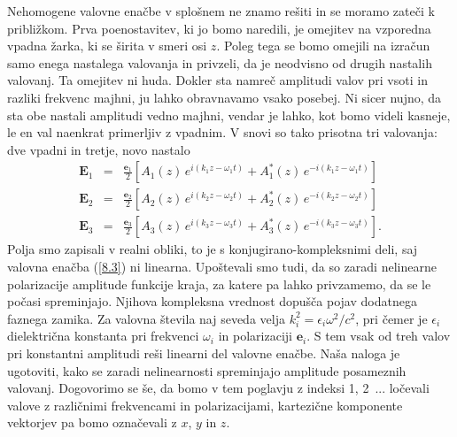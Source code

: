 Nehomogene valovne enačbe v splošnem ne znamo rešiti in se moramo zateči k približkom.
Prva poenostavitev, ki jo bomo naredili, je omejitev na vzporedna vpadna žarka,
ki se širita v smeri osi $z$. Poleg tega se bomo omejili na izračun samo enega
nastalega valovanja in privzeli, da je neodvisno od drugih nastalih valovanj.
Ta omejitev ni huda. Dokler sta namreč amplitudi valov pri vsoti in razliki
frekvenc majhni, ju lahko obravnavamo vsako posebej. Ni sicer nujno,
da sta obe nastali amplitudi vedno majhni, vendar je lahko, kot bomo videli kasneje, 
le en val naenkrat primerljiv z vpadnim. V snovi so tako prisotna tri valovanja:
dve vpadni in tretje, novo nastalo
\begin{eqnarray}
\mathbf{E}_{1} & = & \frac{\mathbf{e}_{1}}{2}\left[A_{1}(z)\, 
e^{i(k_{1}z-\omega_{1}t)}+A_{1}^{*}(z)\, e^{-i(k_{1}z-\omega_{1}t)}\right]\nonumber \\
\mathbf{E}_{2} & = & \frac{\mathbf{e}_{2}}{2}\left[A_{2}(z)\, 
e^{i(k_{2}z-\omega_{2}t)}+A_{2}^{*}(z)\, e^{-i(k_{2}z-\omega_{2}t)}\right]\nonumber \\
\mathbf{E}_{3} & = & \frac{\mathbf{e}_{3}}{2}\left[A_{3}(z)\, 
e^{i(k_{3}z-\omega_{3}t)}+A_{3}^{*}(z)\, e^{-i(k_{3}z-\omega_{3}t)}\right].
\end{eqnarray}
Polja smo zapisali v realni obliki, to je s konjugirano-kompleksnimi
deli, saj valovna enačba (\ref{8.3}) ni linearna. Upoštevali smo tudi,
da so zaradi nelinearne polarizacije amplitude funkcije kraja, za
katere pa lahko privzamemo, da se le počasi spreminjajo. Njihova kompleksna vrednost
dopušča pojav dodatnega faznega zamika. Za valovna
števila naj seveda velja $k_{i}^{2}=\epsilon_{i}\omega^{2}/c^{2}$,
pri čemer je $\epsilon_{i}$ dielektrična konstanta pri frekvenci
$\omega_{i}$ in polarizaciji $\mathbf{e}_{i}$. S tem vsak od treh valov
pri konstantni amplitudi reši linearni del valovne enačbe. Naša naloga
je ugotoviti, kako se zaradi nelinearnosti spreminjajo amplitude posameznih valovanj.
Dogovorimo se še, da bomo v tem poglavju z indeksi 1, 2~... ločevali
valove z različnimi frekvencami in polarizacijami, kartezične komponente
vektorjev pa bomo označevali z $x$, $y$ in $z$. 

